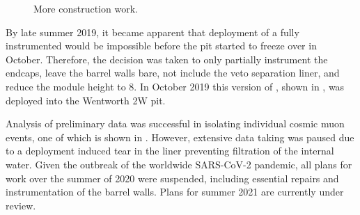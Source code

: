 \begin{figure} %
    \centering
    \quad
    \caption[More \chipsfive construction work]
    {More \chipsfive construction work.}
    \label{fig:work2}
\end{figure}

By late summer 2019, it became apparent that deployment of a fully instrumented \chipsfive would
be impossible before the pit started to freeze over in October. Therefore, the decision was taken
to only partially instrument the endcaps, leave the barrel walls bare, not include the veto
separation liner, and reduce the module height to \SI{8}{}. In October 2019 this version
of \chipsfive, shown in , was deployed into the Wentworth 2W pit.

Analysis of preliminary data was successful in isolating individual cosmic muon events, one of
which is shown in . However, extensive data taking was paused due to a
deployment induced tear in the liner preventing filtration of the internal water. Given the
outbreak of the worldwide SARS-CoV-2 pandemic, all plans for work over the summer of 2020 were
suspended, including essential repairs and instrumentation of the barrel walls. Plans for summer
2021 are currently under review.

